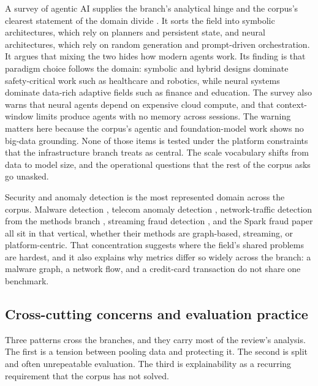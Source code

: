 \documentclass[pdflatex,sn-basic,Numbered]{sn-jnl}%
\begin{document}
A survey of agentic AI supplies the branch's analytical hinge and the corpus's clearest statement of the domain divide \citep{abouali2025agentic}. It sorts the field into symbolic architectures, which rely on planners and persistent state, and neural architectures, which rely on random generation and prompt-driven orchestration. It argues that mixing the two hides how modern agents work. Its finding is that paradigm choice follows the domain: symbolic and hybrid designs dominate safety-critical work such as healthcare and robotics, while neural systems dominate data-rich adaptive fields such as finance and education. The survey also warns that neural agents depend on expensive cloud compute, and that context-window limits produce agents with no memory across sessions. The warning matters here because the corpus's agentic and foundation-model work shows no big-data grounding. None of those items is tested under the platform constraints that the infrastructure branch treats as central. The scale vocabulary shifts from data to model size, and the operational questions that the rest of the corpus asks go unasked.

Security and anomaly detection is the most represented domain across the corpus. Malware detection \citep{mohammadian2025explainable}, telecom anomaly detection \citep{edozie2025telecom}, network-traffic detection from the methods branch \citep{zhang2025graph}, streaming fraud detection \citep{gunbilek2026enhanced}, and the Spark fraud paper \citep{ghodsi2026opinion} all sit in that vertical, whether their methods are graph-based, streaming, or platform-centric. That concentration suggests where the field's shared problems are hardest, and it also explains why metrics differ so widely across the branch: a malware graph, a network flow, and a credit-card transaction do not share one benchmark.

\subsection{Cross-cutting concerns and evaluation practice}\label{subsec26}

Three patterns cross the branches, and they carry most of the review's analysis. The first is a tension between pooling data and protecting it. The second is split and often unrepeatable evaluation. The third is explainability as a recurring requirement that the corpus has not solved.
\end{document}
